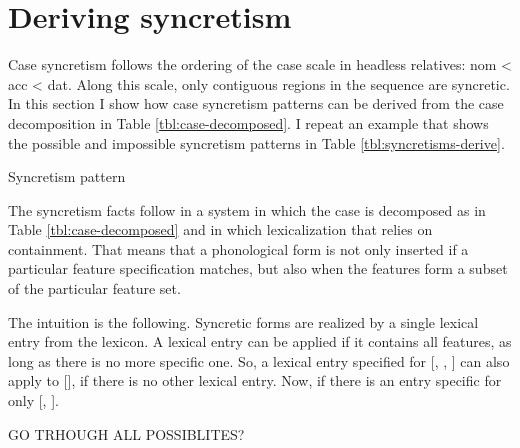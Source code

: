 \section{Deriving syncretism}\label{sec:syncretism}

Case syncretism follows the ordering of the case scale in headless relatives: \ac{nom} < \ac{acc} < \ac{dat}. Along this scale, only contiguous regions in the sequence are syncretic. In this section I show how case syncretism patterns can be derived from the case decomposition in Table \ref{tbl:case-decomposed}. I repeat an example that shows the possible and impossible syncretism patterns in Table \ref{tbl:syncretisms-derive}.

\begin{table}[ht]
  \center
  \caption {Syncretism pattern}
    
  \label{tbl:syncretisms-derive}
\end{table}

The syncretism facts follow in a system in which the case is decomposed as in Table \ref{tbl:case-decomposed} and in which lexicalization that relies on containment. That means that a phonological form is not only inserted if a particular feature specification matches, but also when the features form a subset of the particular feature set.

The intuition is the following. Syncretic forms are realized by a single lexical entry from the lexicon. A lexical entry can be applied if it contains all features, as long as there is no more specific one. So, a lexical entry specified for [, , ] can also apply to [], if there is no other lexical entry. Now, if there is an entry specific for only [, ].

GO TRHOUGH ALL POSSIBLITES?


